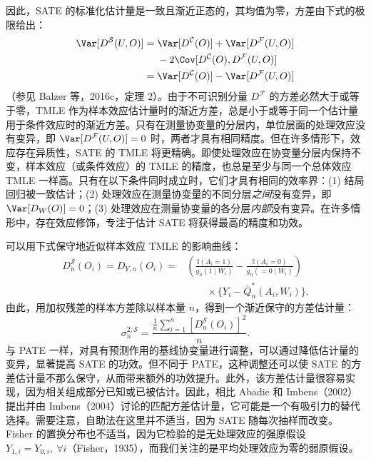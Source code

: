 因此，SATE 的标准化估计量是一致且渐近正态的，其均值为零，方差由下式的极限给出：
\[
\begin{aligned}
\Var[D^{\mathcal S}(U,O)]
={}&\Var[D^{\mathcal C}(O)]+\Var[D^{\mathcal F}(U,O)]\\
&-2\Cov[D^{\mathcal C}(O),D^{\mathcal F}(U,O)]\\
={}&\Var[D^{\mathcal C}(O)]-\Var[D^{\mathcal F}(U,O)]
\end{aligned}
\]
（参见 Balzer 等，2016c，定理 2）。由于不可识别分量 $D^{\mathcal F}$ 的方差必然大于或等于零，TMLE 作为样本效应估计量时的渐近方差，总是小于或等于同一个估计量用于条件效应时的渐近方差。只有在测量协变量的分层内，单位层面的处理效应没有变异，即 $\Var[D^{\mathcal F}(U,O)]=0$ 时，两者才具有相同精度。但在许多情形下，效应存在异质性，SATE 的 TMLE 将更精确。即使处理效应在协变量分层内保持不变，样本效应（或条件效应）的 TMLE 的精度，也总是至少与同一个总体效应 TMLE 一样高。只有在以下条件同时成立时，它们才具有相同的效率界：(1) 结局回归被一致估计；(2) 处理效应在测量协变量的不同分层\emph{之间}没有变异，即 $\Var[D_W(O)]=0$；(3) 处理效应在测量协变量的各分层\emph{内部}没有变异。在许多情形中，存在效应修饰，专注于估计 SATE 将获得最高的精度和功效。

可以用下式保守地近似样本效应 TMLE 的影响曲线：
\begin{equation}
\begin{aligned}
D_n^{\mathcal S}(O_i)=D_{Y,n}(O_i)
={}&\left(\frac{\mathbb I(A_i=1)}{g_n(1\mid W_i)}
-\frac{\mathbb I(A_i=0)}{g_n(=0\mid W_i)}\right)\\
&\qquad\times\{Y_i-\bar Q_n^*(A_i,W_i)\}.
\end{aligned}
\tag{12.4}
\end{equation}
由此，用加权残差的样本方差除以样本量 $n$，得到一个渐近保守的方差估计量：
\[
\sigma_n^{2,\mathcal S}
=\frac{\frac1n\sum_{i=1}^n[D_n^{\mathcal S}(O_i)]^2}{n}.
\]
与 PATE 一样，对具有预测作用的基线协变量进行调整，可以通过降低估计量的变异，显著提高 SATE 的功效。但不同于 PATE，这种调整还可以使 SATE 的方差估计量不那么保守，从而带来额外的功效提升。此外，该方差估计量很容易实现，因为相关组成部分已知或已被估计。因此，相比 Abadie 和 Imbens（2002）提出并由 Imbens（2004）讨论的匹配方差估计量，它可能是一个有吸引力的替代选择。需要注意，自助法在这里并不适当，因为 SATE 随每次抽样而改变。Fisher 的置换分布也不适当，因为它检验的是无处理效应的强原假设 $Y_{1,i}=Y_{0,i},\ \forall i$（Fisher，1935），而我们关注的是平均处理效应为零的弱原假设。
